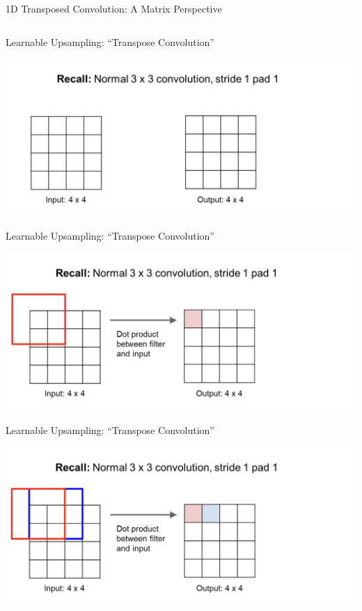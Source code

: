 \documentclass[serif, aspectratio=169]{beamer}
\begin{document}
\begin{frame}{1D Transposed Convolution: A Matrix Perspective}
\begin{columns}[T]
\end{columns}

\end{frame}


\begin{frame}{Learnable Upsampling: “Transpose Convolution”}

    \begin{center}
        \includegraphics[width=\textwidth]{pic/Transpose conv eg1.png} 
    \end{center}
\end{frame}


\begin{frame}{Learnable Upsampling: “Transpose Convolution”}

    \begin{center}
        \includegraphics[width=\textwidth]{pic/Transpose conv eg2.png} 
    \end{center}
\end{frame}

\begin{frame}{Learnable Upsampling: “Transpose Convolution”}

    \begin{center}
        \includegraphics[width=\textwidth]{pic/Transpose conv eg3.png} 
    \end{center}
\end{frame}
\end{document}
